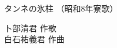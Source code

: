 \documentclass[10pt,b5j]{tarticle} %
\begin{document}
\begin{minipage}[c]{0.7\hsize} %
    \begin{center}
        {\LARGE
            タンネの氷柱 %
        }
        {\small 
            （昭和8年寮歌） %
        }
    \end{center}
\end{minipage}
\begin{minipage}[c]{0.3\hsize} %
    \begin{flushright} %
        卜部清君 作歌\\白石祐義君 作曲 %
    \end{flushright}
\end{minipage}
\end{document}
